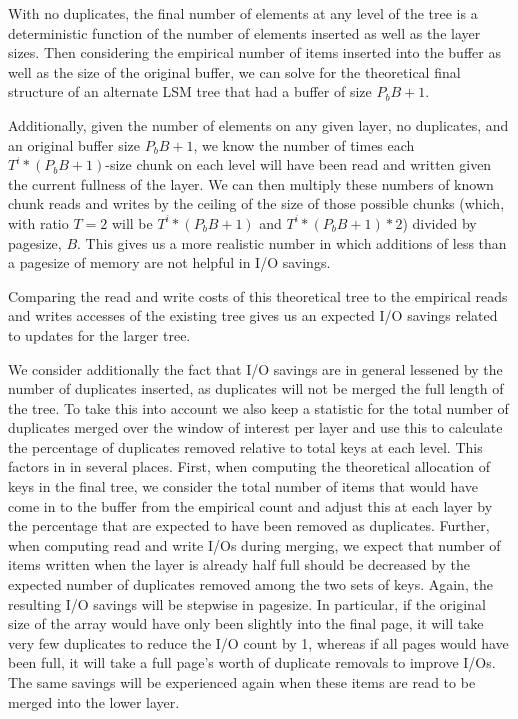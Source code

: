 \documentclass{cidr-2019}
\begin{document}
With no duplicates, the final number of elements at any level of the tree is a
deterministic function of the number of elements inserted as well as the layer
sizes. Then considering the empirical number of items inserted into the buffer
as well as the size of the original buffer, we can solve for the theoretical
final structure of an alternate LSM tree that had a buffer of size $P_bB + 1$.

Additionally, given the number of elements on any given layer, no duplicates,
and an original buffer size $P_bB+1$, we know the number of times each
$T^{i}*(P_bB+1)$-size chunk on each level will have been read and written given
the current fullness of the layer. We can then multiply these numbers of known
chunk reads and writes by the ceiling of the size of those possible chunks
(which, with ratio $T=2$ will be $T^{i}*(P_bB+1)$ and $T^{i}*(P_bB+1)*2$) divided
by pagesize, $B$. This gives us a more realistic number in which additions of
less than a pagesize of memory are not helpful in I/O savings. 

Comparing the read and write costs of this theoretical tree to the empirical
reads and writes accesses of the existing tree gives us an expected I/O savings
related to updates for the larger tree.

We consider additionally the fact that I/O savings are in general lessened by
the number of duplicates inserted, as duplicates will not be merged the full
length of the tree. To take this into account we also keep a statistic for the
total number of duplicates merged over the window of interest per layer and use
this to calculate the percentage of duplicates removed relative to total keys
at each level. This factors in in several places. First, when computing the
theoretical allocation of keys in the final tree, we consider the total number
of items that would have come in to the buffer from the empirical
count and adjust this at each layer by the percentage that are expected to have
been removed as duplicates. Further, when computing read and write I/Os during
merging, we expect that number of items written when the layer is already half
full should be decreased by the expected number of duplicates removed among the
two sets of keys. Again, the resulting I/O savings will be stepwise in
pagesize. In particular, if the original size of the array would have only been
slightly into the final page, it will take very few duplicates to reduce the
I/O count by 1, whereas if all pages would have been full, it will take a full
page's worth of duplicate removals to improve I/Os. The same savings will be
experienced again when these items are read to be merged into the lower layer.
\end{document}
